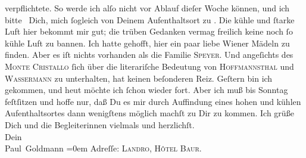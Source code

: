 \begin{ledgroupsized}[t]{13cm}
               verpflichtete. So werde ich alſo nicht vor Ablauf dieſer Woche \label{K_L03077-1v}\label{K_L03077-1h} können, und ich bitte
                   Dich, mich ſogleich von Deinem Aufenthaltsort zu 
               \label{K_L03077-11v}\label{K_L03077-11h}. Die kühle und ſtarke Luft hier bekommt mir
               gut; die trüben Gedanken vermag freilich keine noch ſo kühle Luft zu bannen. Ich
               hatte gehofft, hier ein paar liebe Wiener Mädeln
               zu finden. Aber es iſt nichts vorhanden als die Familie {\pb}\textsc{Speyer}. Und angeſichts des \textsc{Monte Cristallo} ſich über die literariſche Bedeutung von \textsc{Hoffmannsthal} und \textsc{Wassermann} zu unterhalten, hat keinen beſonderen Reiz. Geſtern bin ich gekommen, und heut möchte
               ich ſchon wieder fort. Aber ich muß bis Sonntag
               feſtſitzen und hoffe nur, daß Du es mir durch Auffindung eines hohen und kühlen
               Aufenthaltsortes dann wenigſtens möglich\strikeout{\textcolor{gray}{ſt}} machſt zu Dir zu kommen.\pend
           \pstart
           Ich grüße Dich und die Begleiterinnen vielmals und herzlichſt. {\\[\baselineskip]}Dein {\\[\baselineskip]}\spacefill\mbox{Paul Goldmann}\pend
           \leftskip=0em{}\pstart
           \noindent{}Adreſſe: \textsc{Landro}, \textsc{Hôtel Baur}.\pend
           
         
         \endnumbering{}\end{ledgroupsized}  \newcommand{\dateiname}{L03077}\newcommand{\titel}{Paul Goldmann an Arthur Schnitzler, 5. 8. [1901]}\newcommand{\editorInnen}{Martin Anton Müller und Laura Untner}
      